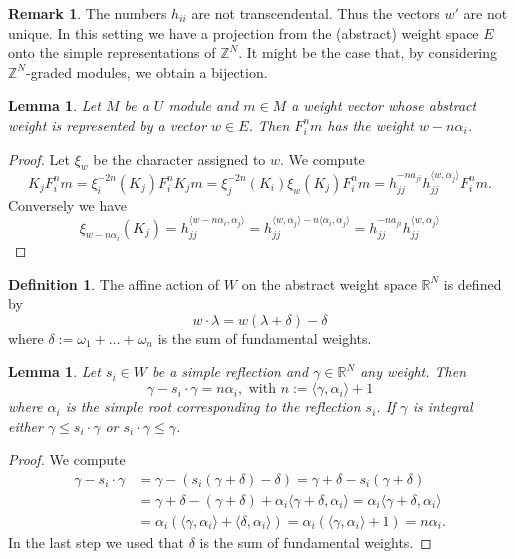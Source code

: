 \documentclass{amsart}
\newtheorem{lemma}[theorem]{Lemma}
\theoremstyle{definition}
\newtheorem{definition}[theorem]{Definition}
\newtheorem*{remark}{Remark}
\begin{document}
\begin{remark}
	The numbers $h_{ii}$ are not transcendental. Thus the vectors $w'$ are not unique. 
	In this setting we have a projection from the (abstract) weight space $E$ onto the simple representations of $\mathbb Z^N$. 
	It might be the case that, by considering  $\mathbb Z^N$-graded modules, we obtain a bijection.
\end{remark}

\begin{lemma}\label{lem: Fis-weights}
	Let $M$ be a $U$ module and $m\in M$ a weight vector whose abstract weight is represented by a vector $w \in E$.
	Then
	$F_i^n m$ has the weight $w - n\alpha_i$.
\end{lemma}
\begin{proof}
	Let $\xi_w$ be the character assigned to $w$.
	We compute 
	$$
		K_j F_i^n m = \xi_i^{-2n}(K_j) F_i^n K_j m 
		= \xi_j^{-2n}(K_i) \xi_w(K_j) F_i^n m 
		=  h_{jj}^{-n a_{ji} } h_{jj}^{\langle w, \alpha_j \rangle }F_i^n m.
	$$
	Conversely we have
	$$
		\xi_{w-n\alpha_i}(K_j)
		= h_{jj}^{\langle w -n\alpha_i, \alpha_j \rangle} 
		= h_{jj}^{\langle w , \alpha_j \rangle
			-n\langle \alpha_i, \alpha_j \rangle}
		=  h_{jj}^{-n a_{ji}} h_{jj}^{\langle w, \alpha_j \rangle }
	$$
\end{proof}

\begin{definition}
	The affine action of $W$ on the abstract weight space $\mathbb R^N$ is defined by
	$$
	w\cdot \lambda = w(\lambda+\delta)-\delta
	$$
	where $\delta := \omega_1+\dotsc+ \omega_n$ is the sum of fundamental weights.
\end{definition}

\begin{lemma}\label{lem: weightsAffACtion}
	Let $s_i\in W$ be a simple reflection and $\gamma \in \mathbb R^N$ any weight.
	Then 
	$$ 
	\gamma- s_i \cdot \gamma = n \alpha_i, \text{ with } n :=  \langle \gamma, \alpha_i \rangle + 1
	$$ 
	where $\alpha_i$ is the simple root corresponding to the reflection $s_i$.
	If $\gamma$ is integral either 
	$\gamma \leq s_i\cdot\gamma$ or $s_i \cdot \gamma \leq \gamma$.
\end{lemma}
\begin{proof}
	We compute
	\begin{align*}
		\gamma- s_i \cdot \gamma 
		& = \gamma -( s_i (\gamma+ \delta) -\delta) 
		= \gamma + \delta - s_i(\gamma +\delta)
		\\
		&= \gamma + \delta - (\gamma +\delta) + \alpha_i \langle \gamma + \delta, \alpha_i \rangle 
		= \alpha_i \langle \gamma+ \delta,\alpha_i \rangle
		\\
		&= \alpha_i 
		\left( \langle \gamma, \alpha_i \rangle + \langle \delta, \alpha_i \rangle \right)
		= \alpha_i 
		\left( \langle \gamma, \alpha_i \rangle + 1 \right)
		= n \alpha_i.
	\end{align*}
	In the last step we used that $\delta$ is the sum of fundamental weights.
\end{proof}
\end{document}
